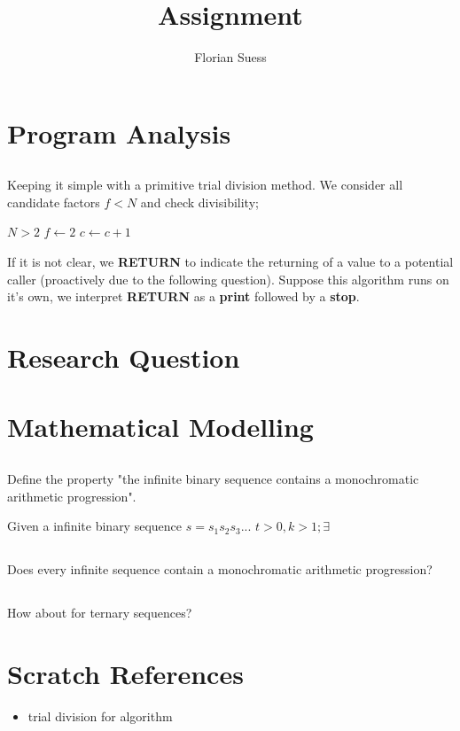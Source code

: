 \documentclass{article}
\title{Assignment}
\author{Florian Suess}
\begin{document}
\maketitle
\section{Program Analysis}
\subsection{}
Keeping it simple with a primitive trial division method. We consider all candidate factors $f < N$ and check divisibility;

\begin{algorithmic}[1]
	\REQUIRE $N > 2$
	\STATE $f \leftarrow 2$
		\ENDIF
		\STATE $c \leftarrow c + 1$
	\ENDWHILE
\end{algorithmic}

If it is not clear, we \textbf{RETURN} to indicate the returning of a value to a potential caller (proactively due to the following question). Suppose this algorithm runs on it's own, we interpret \textbf{RETURN} as a \textbf{print} followed by a \textbf{stop}.

\section{Research Question}
\section{Mathematical Modelling}
\subsection{}
Define the property "the infinite binary sequence contains a monochromatic arithmetic progression".

Given a infinite binary sequence $s = s_{1}s_{2}s_{3}...$
\begin{math}
	t>0,k>1; \exists
\end{math}

\subsection{}
Does every infinite sequence contain a monochromatic arithmetic progression?

\subsection{} How about for ternary sequences?

\section{Scratch References}
\begin{itemize}
	\item trial division for algorithm
\end{itemize}
\end{document}
